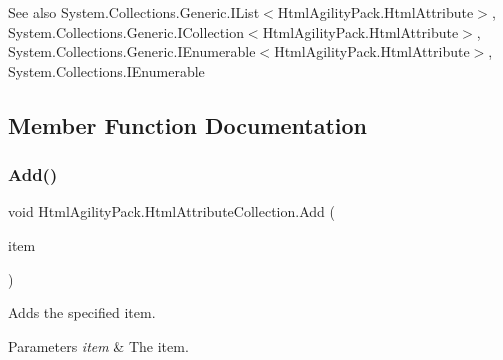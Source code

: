 \begin{DoxySeeAlso}{See also}
System.\+Collections.\+Generic.\+I\+List$<$\+Html\+Agility\+Pack.\+Html\+Attribute$>$, System.\+Collections.\+Generic.\+I\+Collection$<$\+Html\+Agility\+Pack.\+Html\+Attribute$>$, System.\+Collections.\+Generic.\+I\+Enumerable$<$\+Html\+Agility\+Pack.\+Html\+Attribute$>$, System.\+Collections.\+I\+Enumerable


\end{DoxySeeAlso}


\subsection{Member Function Documentation}
\mbox{\label{class_html_agility_pack_1_1_html_attribute_collection_af55dc26d57b597fbb0a11ef1c93df196}} 
\subsubsection{\texorpdfstring{Add()}{Add()}\hspace{0.1cm}{\footnotesize\ttfamily [1/2]}}
{\footnotesize\ttfamily void Html\+Agility\+Pack.\+Html\+Attribute\+Collection.\+Add (\begin{DoxyParamCaption}\item[{\hyperlink{class_html_agility_pack_1_1_html_attribute}{Html\+Attribute}}]{item }\end{DoxyParamCaption})\hspace{0.3cm}{\ttfamily [inline]}}



Adds the specified item. 


\begin{DoxyParams}{Parameters}
{\em item} & The item.\\
\hline
\end{DoxyParams}
\mbox{\label{class_html_agility_pack_1_1_html_attribute_collection_a8b8eefcec035b72ed5d864f105907792}} 
